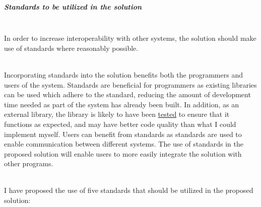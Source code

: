 \documentclass[../../main.tex]{subfiles}
\begin{document}
\subparagraph{Standards to be utilized in the solution\\}

\noindent \\ In order to increase interoperability with other systems, the solution
should make use of standards where reasonably possible.

\noindent \\ Incorporating standards into the solution benefits both
the programmers and users of the system. Standards are beneficial
for programmers as existing libraries can be used which adhere to
the standard, reducing the amount of development time needed as
part of the system has already been built. In addition, as an
external library, the library is likely to have been
\underline{tested} to ensure that it functions as expected,
and may have better code quality than what I could implement myself.
Users can benefit from standards as standards are used to enable
communication between different systems. The use of standards in the
proposed solution will enable users to more easily integrate the solution
with other programs.

\noindent \\ I have proposed the use of five standards that should be
utilized in the proposed solution:
\end{document}
